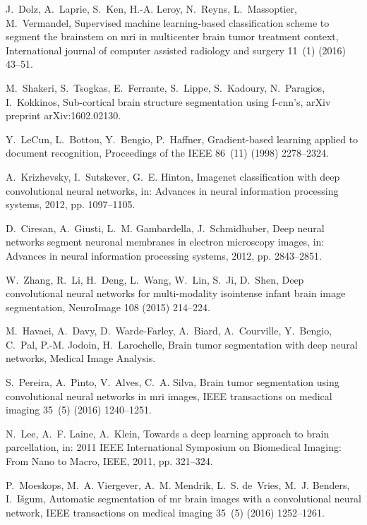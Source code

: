 \documentclass[twoside,fleqn,espcrc2]{elsarticle}
\begin{document}
\begin{thebibliography}{10}
J.~Dolz, A.~Laprie, S.~Ken, H.-A. Leroy, N.~Reyns, L.~Massoptier, M.~Vermandel,
  Supervised machine learning-based classification scheme to segment the
  brainstem on mri in multicenter brain tumor treatment context, International
  journal of computer assisted radiology and surgery 11~(1) (2016) 43--51.

M.~Shakeri, S.~Tsogkas, E.~Ferrante, S.~Lippe, S.~Kadoury, N.~Paragios,
  I.~Kokkinos, Sub-cortical brain structure segmentation using f-cnn's, arXiv
  preprint arXiv:1602.02130.

Y.~LeCun, L.~Bottou, Y.~Bengio, P.~Haffner, Gradient-based learning applied to
  document recognition, Proceedings of the IEEE 86~(11) (1998) 2278--2324.

A.~Krizhevsky, I.~Sutskever, G.~E. Hinton, Imagenet classification with deep
  convolutional neural networks, in: Advances in neural information processing
  systems, 2012, pp. 1097--1105.

D.~Ciresan, A.~Giusti, L.~M. Gambardella, J.~Schmidhuber, Deep neural networks
  segment neuronal membranes in electron microscopy images, in: Advances in
  neural information processing systems, 2012, pp. 2843--2851.

W.~Zhang, R.~Li, H.~Deng, L.~Wang, W.~Lin, S.~Ji, D.~Shen, Deep convolutional
  neural networks for multi-modality isointense infant brain image
  segmentation, NeuroImage 108 (2015) 214--224.

M.~Havaei, A.~Davy, D.~Warde-Farley, A.~Biard, A.~Courville, Y.~Bengio, C.~Pal,
  P.-M. Jodoin, H.~Larochelle, Brain tumor segmentation with deep neural
  networks, Medical Image Analysis.

S.~Pereira, A.~Pinto, V.~Alves, C.~A. Silva, Brain tumor segmentation using
  convolutional neural networks in mri images, IEEE transactions on medical
  imaging 35~(5) (2016) 1240--1251.

N.~Lee, A.~F. Laine, A.~Klein, Towards a deep learning approach to brain
  parcellation, in: 2011 IEEE International Symposium on Biomedical Imaging:
  From Nano to Macro, IEEE, 2011, pp. 321--324.

P.~Moeskops, M.~A. Viergever, A.~M. Mendrik, L.~S. de~Vries, M.~J. Benders,
  I.~I{\v{s}}gum, Automatic segmentation of mr brain images with a
  convolutional neural network, IEEE transactions on medical imaging 35~(5)
  (2016) 1252--1261.


\end{thebibliography}
\end{document}
